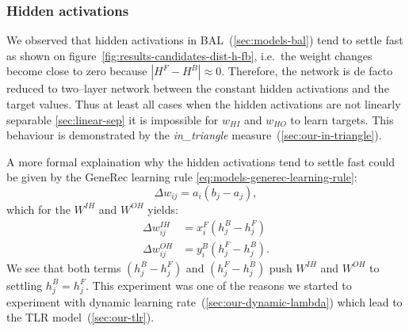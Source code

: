 
\subsubsection{Hidden activations}
\label{sec:our-hidden-activation} 

We observed that hidden activations in BAL~(\ref{sec:models-bal}) tend to settle fast as shown on figure~\ref{fig:results-candidates-dist-h-fb}, i.e.~the weight changes become close to zero because $|H^F - H^B| \approx 0$. Therefore, the network is de facto reduced to two--layer network between the constant hidden activations and the target values. Thus at least all cases when the hidden activations are not linearly separable \ref{sec:linear-sep} it is impossible for $w_{HI}$ and $w_{HO}$ to learn targets. This behaviour is demonstrated by the \emph{in\_triangle} measure~(\ref{sec:our-in-triangle}). 

A more formal explaination why the hidden activations tend to settle fast could be given by the GeneRec learning rule \ref{eq:models-generec-learning-rule}: 
\begin{equation} 
  \Delta w_{ij} = a_i(b_j - a_j),
\end{equation} \nonumber 
which for the $W^{IH}$ and $W^{OH}$ yields: 
\begin{align} 
  \Delta w_{ij}^{IH} &= x^F_i(h^B_j - h^F_j) \nonumber \\ 
  \Delta w_{ij}^{OH} &= y^B_i(h^F_j - h^B_j). \nonumber  
\end{align} 
We see that both terms $(h^B_j - h^F_j)$ and $(h^F_j - h^B_j)$ push $W^{IH}$ and $W^{OH}$ to settling $h^B_j = h^F_j$. This experiment was one of the reasons we started to experiment with dynamic learning rate~(\ref{sec:our-dynamic-lambda}) which lead to the TLR model~(\ref{sec:our-tlr}). 

